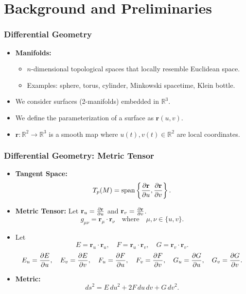 \documentclass[12pt]{beamer}
\begin{document}
\section{Background and Preliminaries}
\begin{frame}
  \frametitle{Differential Geometry}
  \begin{itemize}
    \item \textbf{Manifolds:}
      \begin{itemize}
        \item $n$-dimensional topological spaces that locally resemble Euclidean space.
        \item Examples: sphere, torus, cylinder, Minkowski spacetime, Klein bottle.
      \end{itemize}
    \item We consider surfaces (2-manifolds) embedded in \(\mathbb{R}^3\).
    \item We define the parameterization of a surface as \(\mathbf{r}(u,v)\).
    \item \(\mathbf{r}: \mathbb{R}^2 \to \mathbb{R}^3\) is a smooth map where \(u(t),v(t) \in \mathbb{R}^{2}\) are local coordinates.
  \end{itemize}
\end{frame}

\begin{frame}
    \frametitle{Differential Geometry: Metric Tensor}
    \footnotesize
    \begin{itemize}
      \item \textbf{Tangent Space:} 
        \[
        T_{p}(M) = \mathrm{span}\left\{\pdv{\mathbf{r}}{u},\pdv{\mathbf{r}}{v}\right\}.
        \]
        \item \textbf{Metric Tensor:} 
        Let \(\mathbf{r}_u = \pdv{\mathbf{r}}{u}\) and \(\mathbf{r}_v = \pdv{\mathbf{r}}{v}\).
        \[
        g_{\mu\nu} = \mathbf{r}_{\mu} \cdot \mathbf{r}_{\nu} \quad \text{where} \quad \mu,\nu \in \{u,v\}.
        \]
      \item Let 
        \[
        E = \mathbf{r}_u \cdot \mathbf{r}_u,\quad F = \mathbf{r}_u \cdot \mathbf{r}_v,\quad G = \mathbf{r}_v \cdot \mathbf{r}_v.
        \]
        \[
            E_{u} = \pdv{E}{u}, \quad E_{v} = \pdv{E}{v}, \quad F_{u} = \pdv{F}{u}, \quad F_{v} = \pdv{F}{v}, \quad G_{u} = \pdv{G}{u}, \quad G_{v} = \pdv{G}{v}.
        \]
      \item \textbf{Metric:} 
        \[
        ds^2 = E\,du^2 + 2F\,du\,dv + G\,dv^2.
        \]
    \end{itemize}
  \end{frame}
\end{document}
